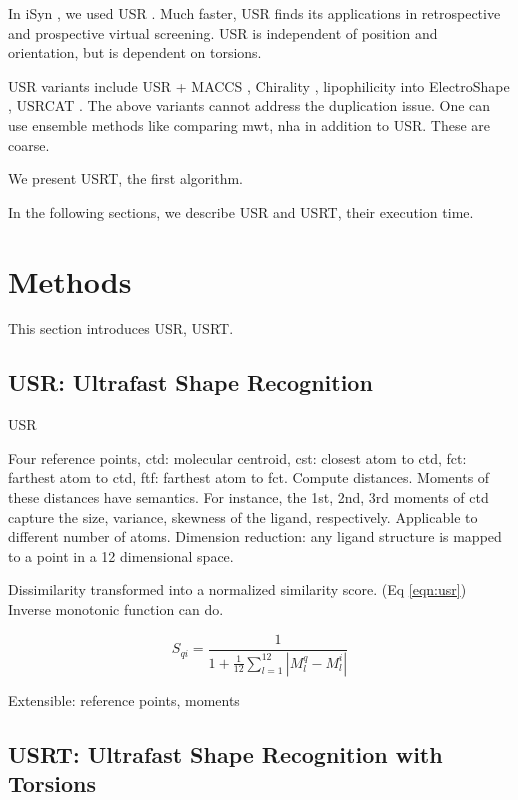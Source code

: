 \documentclass[twocolumn]{svjour3}          %
\begin{document}
In iSyn \cite{1381}, we used USR \cite{1379,1280}. Much faster, USR finds its applications in retrospective \cite{1332} and prospective \cite{1380} virtual screening. USR is independent of position and orientation, but is dependent on torsions.

USR variants include USR + MACCS \cite{1333}, Chirality \cite{1334,1335}, lipophilicity into ElectroShape \cite{1337,1338}, USRCAT \cite{1331}. The above variants cannot address the duplication issue. One can use ensemble methods like comparing mwt, nha in addition to USR. These are coarse.

We present USRT, the first algorithm.

In the following sections, we describe USR and USRT, their execution time.

\section{Methods}
\label{sec:methods}

This section introduces USR, USRT.

\subsection{USR: Ultrafast Shape Recognition}
\label{sec:usr}

USR \cite{1379}

Four reference points, ctd: molecular centroid, cst: closest atom to ctd, fct: farthest atom to ctd, ftf: farthest atom to fct. Compute distances. Moments of these distances have semantics. For instance, the 1st, 2nd, 3rd moments of ctd capture the size, variance, skewness of the ligand, respectively. Applicable to different number of atoms. Dimension reduction: any ligand structure is mapped to a point in a 12 dimensional space.

Dissimilarity transformed into a normalized similarity score. (Eq \ref{eqn:usr}) Inverse monotonic function can do.

\begin{equation}
S_{qi}=\frac{1}{1+\frac{1}{12}\sum_{l=1}^{12}|M_l^q-M_l^i|}
\label{eqn:usr}
\end{equation}

Extensible: reference points, moments

\subsection{USRT: Ultrafast Shape Recognition with Torsions}
\label{sec:usrt}
\end{document}
